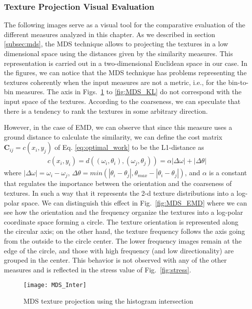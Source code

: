 \pagebreak
\subsubsection{Texture Projection Visual Evaluation}\label{sec:sm_mds}

The following images serve as a visual tool for the comparative evaluation of the different measures analyzed in this chapter. As we described in section \ref{subsec:mds}, the MDS technique allows to projecting the textures in a low dimensional space using the distances given by the similarity measures. This representation is carried out in a two-dimensional Euclidean space in our case. In the figures, we can notice that the MDS technique has problems representing the textures coherently when the input measures are not a metric, i.e., for the bin-to-bin measures. The axis in  Figs.\ \ref{fig:MDS_Inter} to \ref{fig:MDS_KL} do not correspond with the input space of the textures. According to the coarseness, we can speculate that there is a tendency to rank the textures in some arbitrary direction.

However, in the case of EMD, we can observe that since this measure uses a ground distance to calculate the similarity, we can define the cost matrix $\mathbf{C}_{ij} = c(x_i, y_j)$ of Eq. \ref{eq:optimal_work} to be the L1-distance as
\begin{eqnarray} 
 c(x_i, y_i) = d((\omega_i, \theta_i), (\omega_j, \theta_j))=\alpha|\Delta \omega| + |\Delta \theta| \label{eq:ground_distance}
\end{eqnarray}
where $|\Delta \omega| = \omega_i - \omega_j$, $\Delta \theta=min(|\theta_i-\theta_j|, \theta_{max} - |\theta_i-\theta_j|)$, and $\alpha$ is a constant that regulates the importance between the orientation and the coarseness of textures. In such a way that it represents the 2-d texture distributions into a log-polar space. We can distinguish this effect in Fig.\ \ref{fig:MDS_EMD} where we can see how the orientation and the frequency organize the textures into a log-polar coordinate space forming a circle. The texture orientation is represented along the circular axis; on the other hand, the texture frequency follows the axis going from the outside to the circle center. The lower frequency images remain at the edge of the circle, and those with high frequency (and low directionality) are grouped in the center. This behavior is not observed with any of the other measures and is reflected in the stress value of Fig.\ \ref{fig:stress}.

\begin{figure}[!ht]
 \centering    
 \texttt{[image: MDS\_Inter]}
 \caption{MDS texture projection using the histogram intersection}
 \label{fig:MDS_Inter} 
\end{figure}

